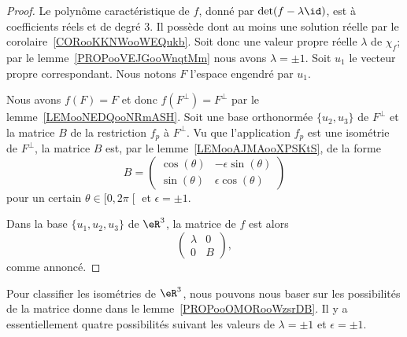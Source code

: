 \begin{proof}
    Le polynôme caractéristique de \( f\), donné par \( \det(f-\lambda\id)\), est à coefficients réels et de degré \( 3\). Il possède dont au moins une solution réelle par le corolaire~\ref{CORooKKNWooWEQukb}. Soit donc une valeur propre réelle \( \lambda\) de \( \chi_f\); par le lemme~\ref{PROPooVEJGooWnqtMm} nous avons \( \lambda=\pm 1\). Soit \( u_1\) le vecteur propre correspondant. Nous notons \( F\) l'espace engendré par \( u_1\).

    Nous avons \( f(F)=F\) et donc \( f(F^{\perp})=F^{\perp}\) par le lemme~\ref{LEMooNEDQooNRmASH}. Soit une base orthonormée \( \{ u_2,u_3 \}\) de \( F^{\perp}\) et la matrice \( B\) de la restriction \( f_{p}\) à \( F^{\perp}\). Vu que l'application \( f_p\) est une isométrie de \( F^{\perp}\), la matrice \( B\) est, par le lemme~\ref{LEMooAJMAooXPSKtS}, de la forme
    \begin{equation}
        B=\begin{pmatrix}
            \cos(\theta)    &   -\epsilon\sin(\theta)    \\
            \sin(\theta)    &   \epsilon\cos(\theta)
        \end{pmatrix}
    \end{equation}
    pour un certain \( \theta\in\mathopen[ 0 , 2\pi \mathclose[\) et \( \epsilon=\pm 1\).

    Dans la base \( \{u_1,u_2,u_3\}\) de \( \eR^3\), la matrice de \( f\) est alors
    \begin{equation}
        \begin{pmatrix}
            \lambda    &   0    \\
            0    &   B
        \end{pmatrix},
    \end{equation}
    comme annoncé.
\end{proof}

Pour classifier les isométries de \( \eR^3\), nous pouvons nous baser sur les possibilités de la matrice donne dans le lemme~\ref{PROPooOMORooWzsrDB}. Il y a essentiellement quatre possibilités suivant les valeurs de \( \lambda=\pm 1\) et \( \epsilon=\pm 1\).

